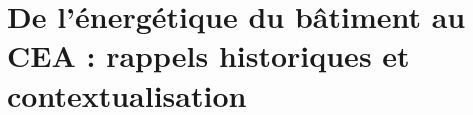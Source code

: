 \part{De l'énergétique du bâtiment au CEA : rappels historiques et contextualisation}\label{part:de-l'energetique-du-batiment-au-cea-:-rappels-historiques-et-contextualisation}
    
    
    
